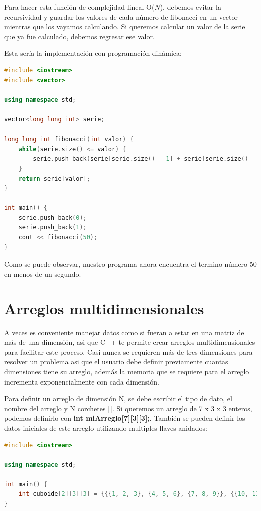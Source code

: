 \documentclass{article}
\begin{document}
Para hacer esta función de complejidad lineal O($N$), debemos evitar la recursividad y guardar los valores de cada número de fibonacci en un vector mientras que los vayamos calculando. Si queremos calcular un valor de la serie que ya fue calculado, debemos regresar ese valor.

Esta sería la implementación con programación dinámica:

\begin{lstlisting}[language=C++, title=Programación dinámica]
#include <iostream>
#include <vector>

using namespace std;

vector<long long int> serie;

long long int fibonacci(int valor) {
	while(serie.size() <= valor) {
		serie.push_back(serie[serie.size() - 1] + serie[serie.size() - 2]);
	}
	return serie[valor];
}

int main() {
	serie.push_back(0);
	serie.push_back(1);
	cout << fibonacci(50);
}
\end{lstlisting}

Como se puede observar, nuestro programa ahora encuentra el termino número 50 en menos de un segundo.

\section{Arreglos multidimensionales}

A veces es conveniente manejar datos como si fueran a estar en una matriz de más de una dimensión, asi que C++ te permite crear arreglos multidimensionales para facilitar este proceso. Casi nunca se requieren más de tres dimensiones para resolver un problema asi que el usuario debe definir previamente cuantas dimensiones tiene su arreglo, además la memoria que se requiere para el arreglo incrementa exponencialmente con cada dimensión.

Para definir un arreglo de dimensión N, se debe escribir el tipo de dato, el nombre del arreglo y N corchetes \textbf{[]}. Si queremos un arreglo de 7 x 3 x 3 enteros, podemos definirlo con \textbf{int miArreglo[7][3][3];}. También se pueden definir los datos iniciales de este arreglo utilizando multiples llaves anidados:

\begin{lstlisting}[language=C++, title=Asignando valores]
#include <iostream>

using namespace std;

int main() {
	int cuboide[2][3][3] = {{{1, 2, 3}, {4, 5, 6}, {7, 8, 9}}, {{10, 11, 12}, {13, 14, 15}, {16, 17, 18}}};
}
\end{lstlisting}
\end{document}
